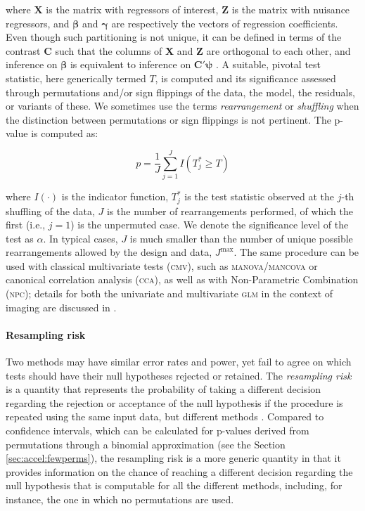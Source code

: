\noindent
where $\mathbf{X}$ is the matrix with regressors of interest, $\mathbf{Z}$ is the matrix with nuisance regressors, and $\boldsymbol{\beta}$ and $\boldsymbol{\gamma}$ are respectively the vectors of regression coefficients. Even though such partitioning is not unique, it can be defined in terms of the contrast $\mathbf{C}$ such that the columns of $\mathbf{X}$ and $\mathbf{Z}$ are orthogonal to each other, and inference on $\boldsymbol{\beta}$ is equivalent to inference on $\mathbf{C}'\boldsymbol{\psi}$ \citep{Beckmann2001, Smith2007, Winkler2014}. A suitable, pivotal test statistic, here generically termed $T$, is computed and its significance assessed through permutations and/or sign flippings of the data, the model, the residuals, or variants of these. We sometimes use the terms \emph{rearrangement} or \emph{shuffling} when the distinction between permutations or sign flippings is not pertinent. The p-value is computed as:

\begin{equation}
p=\frac{1}{J}\sum_{j=1}^J I\left( T_j^{*} \geqslant T \right)
\label{eqn:pvalue}
\end{equation}

\noindent
where $I(\cdot)$ is the indicator function, $T_j^{*}$ is the test statistic observed at the $j$-th shuffling of the data, $J$ is the number of rearrangements performed, of which the first (i.e., $j=1$) is the unpermuted case. We denote the significance level of the test as $\alpha$. In typical cases, $J$ is much smaller than the number of unique possible rearrangements allowed by the design and data, $J^{\text{max}}$. The same procedure can be used with classical multivariate tests (\textsc{cmv}), such as \textsc{manova}/\textsc{mancova} or canonical correlation analysis (\textsc{cca}), as well as with Non-Parametric Combination (\textsc{npc}); details for both the univariate and multivariate \textsc{glm} in the context of imaging are discussed in \citet{Winkler2014, Winkler2016_npc}.

\paragraph{Resampling risk} Two methods may have similar error rates and power, yet fail to agree on which tests should have their null hypotheses rejected or retained. The \emph{resampling risk} is a quantity that represents the probability of taking a different decision regarding the rejection or acceptance of the null hypothesis if the procedure is repeated using the same input data, but different methods \citep{Jockel1984}. Compared to confidence intervals, which can be calculated for p-values derived from permutations through a binomial approximation (see the Section \ref{sec:accel:fewperms}), the resampling risk is a more generic quantity in that it provides information on the chance of reaching a different decision regarding the null hypothesis that is computable for all the different methods, including, for instance, the one in which no permutations are used.

